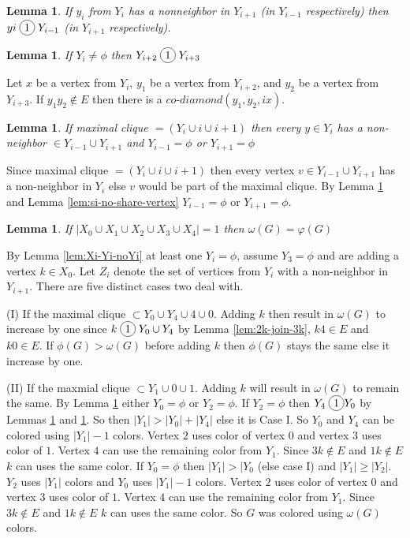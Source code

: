 \documentclass[12pt]{article}
\newcommand*\circled[1]{\tikz[baseline=(char.base)]{
            \node[shape=circle,draw,inner sep=2pt] (char) {#1};}}
\newtheorem{Lemma}[Theorem]{Lemma}
\begin{document}
{\begin{Lemma}\label{lem:yi-miss-two-neighbors}
If $y_i$ from $Y_i$ has a nonneighbor in $Y_{i+1}$ (in $Y_{i-1}$ respectively) then $yi \;\circled{1}\; Y_{i-1}$ (in $Y_{i+1}$ respectively).
\end{Lemma}

\begin{Lemma}\label{lem:yi-force-join}
If $Y_i \neq \phi$ then $Y_{i+2} \;\circled{1}\; Y_{i+3}$
\end{Lemma}
 Let $x$ be a vertex from $Y_i$, $y_1$ be a vertex from $Y_{i+2}$, and $y_2$ be a vertex from $Y_{i+3}$. If $y_1y_2\not\in E$ then there is a $co$-$diamond (y_1, y_2, ix)$. 

\begin{Lemma}\label{lem:max-clique-yi}
If maximal clique $ = (Y_i \cup i \cup i+1)$ then every $y \in Y_i$ has a non-neighbor $\in Y_{i-1} \cup Y_{i+1}$ and $Y_{i-1} = \phi$ or $Y_{i+1} = \phi$
\end{Lemma}
 Since maximal clique $ = (Y_i \cup i \cup i+1)$ then every vertex $v \in Y_{i-1} \cup Y_{i+1}$ has a non-neighbor in $Y_i$ else $v$ would be part of the maximal clique. By Lemma \ref{lem:yi-miss-two-neighbors} and Lemma \ref{lem:si-no-share-vertex} $Y_{i-1} = \phi$ or $Y_{i+1} = \phi$.

\begin{Lemma}\label{lem:add-2vertex}
If $|X_0 \cup X_1 \cup X_2 \cup X_3 \cup X_4| = 1$ then $\omega(G) =  \varphi(G)$
\end{Lemma}
 By Lemma \ref{lem:Xi-Yi-noYi} at least one $Y_i = \phi$, assume $Y_3 = \phi$ and are adding a vertex $k \in X_0$. Let $Z_i$ denote the set of vertices from $Y_i$ with a non-neighbor in $Y_{i+1}$. There are five distinct cases two deal with.

(I) If the maximal clique $\subset Y_0 \cup Y_4 \cup 4 \cup 0$. Adding $k$ then result in $\omega(G)$ to increase by one since $k \;\circled{1}\; Y_0 \cup Y_4$ by Lemma \ref{lem:2k-join-3k}, $k4 \in E$ and $k0 \in E$. If $\phi(G) > \omega(G)$ before adding $k$ then $\phi(G)$ stays the same else it increase by one.

(II) If the maxmial clique $\subset Y_1 \cup 0 \cup 1$. Adding $k$ will result in $\omega(G)$ to remain the same. By Lemma \ref{lem:max-clique-yi} either $Y_0 = \phi$ or $Y_2 = \phi$. If $Y_2 = \phi$ then $Y_4 \;\circled{1} Y_0$ by Lemmas \ref{lem:max-clique-yi} and \ref{lem:yi-miss-two-neighbors}. So then $|Y_1| > |Y_0| + |Y_4|$ else it is Case I. So $Y_0$ and $Y_4$ can be colored using $|Y_1| - 1$ colors. Vertex $2$ uses color of vertex $0$ and vertex $3$ uses color of $1$. Vertex $4$ can use the remaining color from $Y_1$. Since $3k \not \in E$ and $1k \not \in E$ $k$ can uses the same color. If $Y_0 = \phi$ then $|Y_1| > |Y_0$ (else case I) and $|Y_1| \geq |Y_2|$. $Y_2$ uses $|Y_1|$ colors and $Y_0$ uses $|Y_1| - 1$ colors. Vertex $2$ uses color of vertex $0$ and vertex $3$ uses color of $1$. Vertex $4$ can use the remaining color from $Y_1$. Since $3k \not \in E$ and $1k \not \in E$ $k$ can uses the same color. So $G$ was colored using $\omega(G)$ colors.

}
\end{document}
